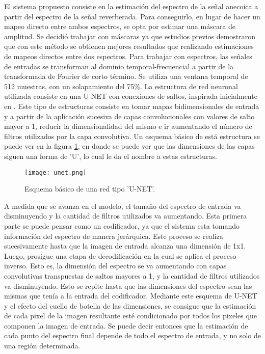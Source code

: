 El sistema propuesto consiste en la estimación del espectro de la señal anecoica a partir del espectro de la señal reverberada. Para conseguirlo, en lugar de hacer un mapeo directo entre ambos espectros, se opta por estimar una máscara de amplitud. Se decidió trabajar con máscaras ya que estudios previos demostraron que con este método se obtienen mejores resultados que realizando estimaciones de mapeos directos entre dos espectros. Para trabajar con espectros, las señales de entradas se transforman al dominio temporal-frecuencial a partir de la transformada de Fourier de corto término. Se utiliza una ventana temporal de 512 muestras, con un solapamiento del 75\%. 
La estructura de red neuronal utilizada consiste en una U-NET con conexiones de saltos, inspirada inicialmente en \cite{FCN}. Este tipo de estructuras consiste en tomar mapas bidimensionales de entrada y a partir de la aplicación sucesiva de capas convolucionales con valores de salto mayor a 1, reducir la dimensionalidad del mismo e ir aumentando el número de filtros utilizados por la capa convolutiva. Un esquema básico de está estructura se puede ver en la figura \ref{fig:unet}, en donde se puede ver que las dimensiones de las capas siguen una forma de 'U', lo cual le da el nombre a estas estructuras.

\begin{figure}[H]
	\centering{}
	\texttt{[image: unet.png]}
	\caption{Esquema básico de una red tipo 'U-NET'.}
	\label{fig:unet}
\end{figure}

A medida que se avanza en el modelo, el tamaño del espectro de entrada va disminuyendo y la cantidad de filtros utilizados va aumentando. Esta primera parte se puede pensar como un codificador, ya que el sistema esta tomando información del espectro de manera jerárquica.  Este proceso se realiza sucesivamente hasta que la imagen de entrada alcanza una dimensión de 1x1. Luego, prosigue una etapa de decodificación en la cual se aplica el proceso inverso. Esto es, la dimensión del espectro se va aumentando con capas convolutivas transpuestas de saltos mayores a 1, y la cantidad de filtros utilizados va disminuyendo. Esto se repite hasta que las dimensiones del espectro sean las mismas que tenía a la entrada del codificador. Mediante este esquema de U-NET y el efecto del cuello de botella de las dimensiones, se consigue que la estimación de cada pixel de la imagen resultante esté condicionado por todos los pixeles que componen la imagen de entrada. Se puede decir entonces que la estimación de cada punto del espectro final depende de todo el espectro de entrada, y no solo de una región determinada. 

